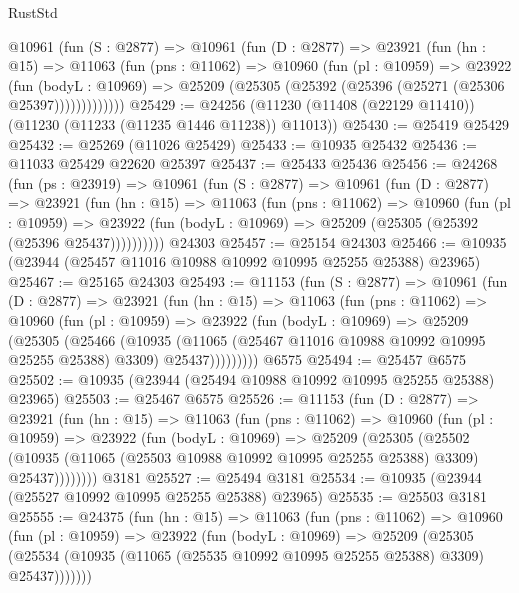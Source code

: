 \begin{lexlean}{RustStd}
\begin{coremodule}
{{{{{{{{{{{{{{{{{{{      @10961
        (fun (S : @2877) =>
        @10961
          (fun (D : @2877) =>
          @23921
            (fun (hn : @15) =>
            @11063
              (fun (pns : @11062) =>
              @10960
                (fun (pl : @10959) =>
                @23922
                  (fun (bodyL : @10969) =>
                  @25209 (@25305 (@25392 (@25396 (@25271 (@25306 @25397)))))))))))))
@25429 := @24256 (@11230 (@11408 (@22129 @11410)) (@11230 (@11233 (@11235 @1446 @11238)) @11013))
@25430 := @25419 @25429
@25432 := @25269 (@11026 @25429)
@25433 := @10935 @25432
@25436 := @11033 @25429 @22620 @25397
@25437 := @25433 @25436
@25456 := @24268
    (fun (ps : @23919) =>
    @10961
      (fun (S : @2877) =>
      @10961
        (fun (D : @2877) =>
        @23921
          (fun (hn : @15) =>
          @11063
            (fun (pns : @11062) =>
            @10960
              (fun (pl : @10959) =>
              @23922 (fun (bodyL : @10969) => @25209 (@25305 (@25392 (@25396 @25437))))))))))
    @24303
@25457 := @25154 @24303
@25466 := @10935 (@23944 (@25457 @11016 @10988 @10992 @10995 @25255 @25388) @23965)
@25467 := @25165 @24303
@25493 := @11153
    (fun (S : @2877) =>
    @10961
      (fun (D : @2877) =>
      @23921
        (fun (hn : @15) =>
        @11063
          (fun (pns : @11062) =>
          @10960
            (fun (pl : @10959) =>
            @23922
              (fun (bodyL : @10969) =>
              @25209
                (@25305
                  (@25466
                    (@10935
                      (@11065 (@25467 @11016 @10988 @10992 @10995 @25255 @25388) @3309)
                      @25437)))))))))
    @6575
@25494 := @25457 @6575
@25502 := @10935 (@23944 (@25494 @10988 @10992 @10995 @25255 @25388) @23965)
@25503 := @25467 @6575
@25526 := @11153
    (fun (D : @2877) =>
    @23921
      (fun (hn : @15) =>
      @11063
        (fun (pns : @11062) =>
        @10960
          (fun (pl : @10959) =>
          @23922
            (fun (bodyL : @10969) =>
            @25209
              (@25305
                (@25502
                  (@10935 (@11065 (@25503 @10988 @10992 @10995 @25255 @25388) @3309) @25437))))))))
    @3181
@25527 := @25494 @3181
@25534 := @10935 (@23944 (@25527 @10992 @10995 @25255 @25388) @23965)
@25535 := @25503 @3181
@25555 := @24375
    (fun (hn : @15) =>
    @11063
      (fun (pns : @11062) =>
      @10960
        (fun (pl : @10959) =>
        @23922
          (fun (bodyL : @10969) =>
          @25209
            (@25305
              (@25534 (@10935 (@11065 (@25535 @10992 @10995 @25255 @25388) @3309) @25437)))))))
}}}}}}}}}}}}}}}}}}}
\end{coremodule}
\end{lexlean}

